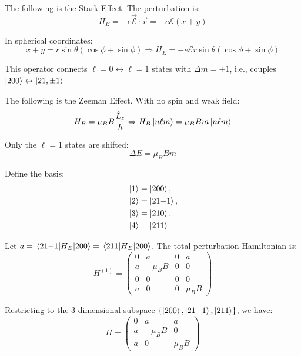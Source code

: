 \documentclass[12pt]{article}
\begin{document}
        The following is the Stark Effect. The perturbation is:
        \[
            H_E = -e \vec{\mathcal{E}} \cdot \vec{r} = -e \mathcal{E} (x + y)
        \]
        
        In spherical coordinates:
        \[
            x + y = r \sin\theta (\cos\phi + \sin\phi)
            \Rightarrow H_E = -e \mathcal{E} r \sin\theta (\cos\phi + \sin\phi)
        \]
        
        This operator connects \( \ell = 0 \leftrightarrow \ell = 1 \) states with \( \Delta m = \pm 1 \), i.e., couples \( \ket{200} \leftrightarrow \ket{21,\pm1} \)
        
        The following is the Zeeman Effect. With no spin and weak field:
        \[
            H_B = \mu_B B \frac{\hat{L}_z}{\hbar}
            \Rightarrow H_B \ket{n\ell m} = \mu_B B m \ket{n\ell m}
        \]
        
        Only the \( \ell = 1 \) states are shifted:
        \[
            \Delta E = \mu_B B m
        \]
        
        Define the basis:
        \[
            \begin{aligned}
                &\ket{1} = \ket{200}, \\
                &\ket{2} = \ket{21{-1}}, \\
                &\ket{3} = \ket{210}, \\
                &\ket{4} = \ket{211}
            \end{aligned}
        \]
        
        Let \( a = \mel{21{-1}}{H_E}{200} = \mel{211}{H_E}{200} \). The total perturbation Hamiltonian is:
        \[
            H^{(1)} =
            \begin{pmatrix}
                0 & a & 0 & a \\
                a & -\mu_B B & 0 & 0 \\
                0 & 0 & 0 & 0 \\
                a & 0 & 0 & \mu_B B
            \end{pmatrix}
        \]
        
        Restricting to the 3-dimensional subspace \( \{ \ket{200}, \ket{21{-1}}, \ket{211} \} \), we have:
        \[
            H =
            \begin{pmatrix}
                0 & a & a \\
                a & -\mu_B B & 0 \\
                a & 0 & \mu_B B
            \end{pmatrix}
        \]
        
\end{document}
